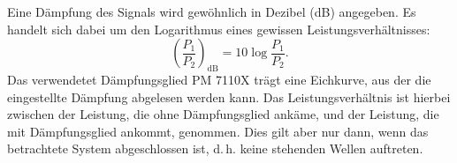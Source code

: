 Eine Dämpfung des Signals wird gewöhnlich in Dezibel (dB) angegeben.  Es
handelt sich dabei um den Logarithmus eines gewissen
Leistungsverhältnisses:
%
\begin{equation}
  \left(\frac{P_1}{P_2}\right)_\text{dB} = 10 \log \frac{P_1}{P_2}.
\end{equation}
Das verwendetet Dämpfungsglied PM 7110X trägt eine Eichkurve, aus der
die eingestellte Dämpfung abgelesen werden kann.  Das
Leistungsverhältnis ist hierbei zwischen der Leistung, die ohne
Dämpfungsglied ankäme, und der Leistung, die mit Dämpfungsglied ankommt,
genommen.  Dies gilt aber nur dann, wenn das betrachtete System
abgeschlossen ist, d.\,h. keine stehenden Wellen auftreten.
